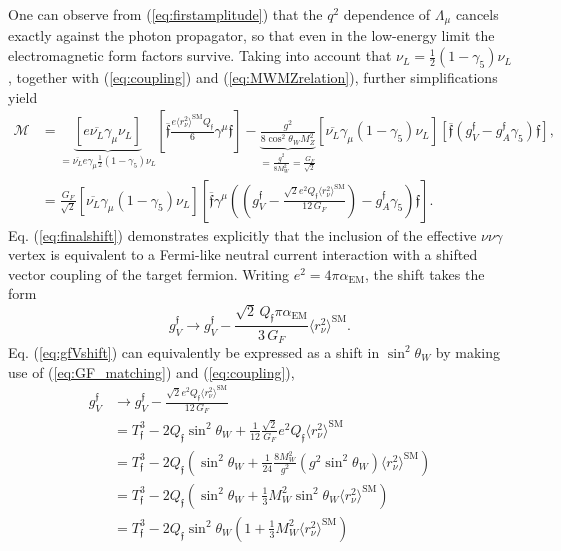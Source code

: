 \noindent One can observe from (\ref{eq:firstamplitude}) that the $q^2$ dependence of $\Lambda_\mu$ cancels exactly against the photon propagator, so that even in the low-energy limit the electromagnetic form factors survive. Taking into account that $\nu_L = \frac{1}{2}(1-\gamma_5)\nu_L$, together with (\ref{eq:coupling}) and (\ref{eq:MWMZrelation}), further simplifications yield
%
\begin{align}\nonumber
\mathcal{M} &= \underbrace{\left[e\overline{\nu_L}\gamma_\mu\nu_L\right]}_{=\overline{\nu_L}e\gamma_\mu\frac{1}{2}(1-\gamma_5)\nu_L}\left[\overline{\mathfrak{f}}\frac{e\langle r^2_\nu\rangle^\text{SM}Q_\mathfrak{f}}{6}\gamma^\mu \mathfrak{f}\right] - \underbrace{\frac{g^2}{8\cos^2 \theta_W M_Z^2}}_{=\frac{g^2}{8M_W^2}=\frac{G_F}{\sqrt{2}}}\left[\overline{\nu_L}\gamma_\mu(1-\gamma_5)\nu_L\right]\left[\overline{\mathfrak{f}}(g^{\mathfrak{f}}_V-g^{\mathfrak{f}}_A\gamma_5)\mathfrak{f}\right],\\ \label{eq:finalshift}
&=\frac{G_F}{\sqrt{2}}\left[\overline{\nu_L}\gamma_\mu(1-\gamma_5)\nu_L\right]\left[\overline{\mathfrak{f}}\gamma^\mu\left(\left(g^\mathfrak{f}_V - \frac{\sqrt{2}e^2Q_\mathfrak{f}\langle r^2_\nu\rangle^\text{SM}}{12\,G_F}\right) - g^{\mathfrak{f}}_A\gamma_5\right)\mathfrak{f}\right].
\end{align}
%
Eq. (\ref{eq:finalshift}) demonstrates explicitly that the inclusion of the effective $\nu\nu\gamma$ vertex is equivalent to a Fermi-like neutral current interaction with a shifted vector coupling of the target fermion. Writing $e^2 = 4\pi\alpha_{\text{EM}}$, the shift takes the form
%
\begin{equation}\label{eq:gfVshift}
g^\mathfrak{f}_V \rightarrow g^\mathfrak{f}_V - \frac{\sqrt{2}\,Q_{\mathfrak{f}}\pi\alpha_{\text{EM}}}{3\,G_F}\langle r^2_\nu\rangle^{\text{SM}}.
\end{equation}
%
Eq. (\ref{eq:gfVshift}) can equivalently be expressed as a shift in $\sin^2\theta_W$ by making use of (\ref{eq:GF_matching}) and (\ref{eq:coupling}),
%
\begin{align}\nonumber
    g^\mathfrak{f}_V &\rightarrow g^\mathfrak{f}_V - \frac{\sqrt{2}e^2 Q_\mathfrak{f} \langle r^2_\nu\rangle^\text{SM}}{12\,G_F}\\ \nonumber
    &= T^3_{\mathfrak{f}} - 2 Q_{\mathfrak{f}}\sin^2\theta_W + \frac{1}{12}\frac{\sqrt{2}}{G_F}e^2 Q_{\mathfrak{f}}\langle r^2_\nu\rangle^\text{SM}\\ \nonumber
    &= T^3_{\mathfrak{f}} - 2 Q_{\mathfrak{f}}\left(\sin^2\theta_W + \frac{1}{24}\frac{8M_W^2}{g^2}(g^2 \sin^2 \theta_W)\langle r^2_\nu\rangle^\text{SM}\right)\\ \nonumber
    &= T^3_{\mathfrak{f}} - 2Q_{\mathfrak{f}}\left(\sin^2\theta_W + \frac{1}{3}M_W^2\sin^2\theta_W \langle r^2_\nu\rangle^\text{SM}\right)\\ \label{eq:sinshift1}
    &= T^3_{\mathfrak{f}} - 2Q_{\mathfrak{f}}\sin^2\theta_W\left(1 + \frac{1}{3}M_W^2\langle r^2_\nu\rangle^\text{SM}\right)
\end{align}
